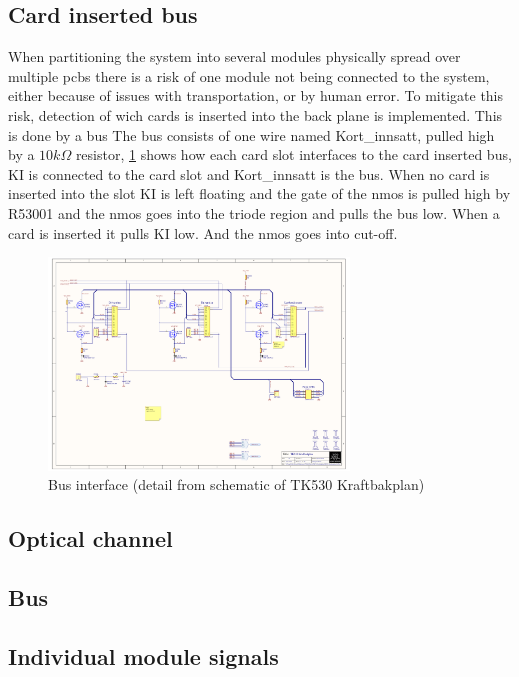 \subsection{Card inserted bus}
When partitioning the system into several modules physically spread over multiple pcbs there is a risk of one module not being connected to the system, either because of issues with transportation, or by human error. To mitigate this risk, detection of wich cards is inserted into the back plane is implemented. This is done by a bus  
The bus consists of one wire named Kort\_innsatt, pulled high by a $10k\Omega$ resistor, \cref{fig:ki_bi} shows how each card slot interfaces to the card inserted bus, KI is connected to the card slot and Kort\_innsatt is the bus. When no card is inserted into the slot KI is left floating and the gate of the nmos is pulled high by R53001 and the nmos goes into the triode region and pulls the bus low. When a card is inserted it pulls KI low. And the nmos goes into cut-off.

\begin{figure}[h]
    \centering
    \includegraphics[trim={1cm 15cm 25.5cm 3cm},clip,width=8cm]{img/TK530_Kraftbakplan.pdf}
    \caption{Bus interface (detail from schematic of TK530 Kraftbakplan)}
    \label{fig:ki_bi}
\end{figure}

\subsection{Optical channel}
\label{optical}

\subsection{Bus}
\label{bus}

\subsection{Individual module signals}